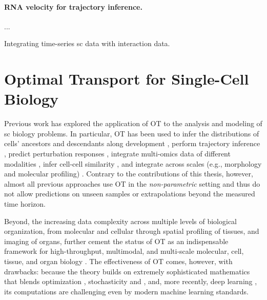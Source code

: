\paragraph{RNA velocity for trajectory inference.}
...

Integrating time-series \acrlong{sc} data with interaction data. 

\section{Optimal Transport for Single-Cell Biology}
\label{sec:ot_for_biology}

Previous work has explored the application of \acrlong{OT} to the analysis and modeling of \acrlong{sc} biology problems.
In particular, \acrshort{OT} has been used to infer the distributions of cells' ancestors and descendants along development \citep{schiebinger2019optimal}, perform trajectory inference \citep{bunne2022proximal, forrow2021lineageot, bunne2022recovering, lavenant2021towards, schiebinger2019optimal, tong2020trajectorynet, yang2020predicting, zhang2021optimal, chizat2022trajectory}, predict perturbation responses \citep{bunne2021learning, yang2018scalable, lubeck2022neural}, integrate multi-omics data of different modalities \citep{demetci2022scot}, infer cell-cell similarity \citep{huizing2022optimal}, and integrate across scales (e.g., morphology and molecular profiling) \citep{yang2021multi}. 
Contrary to the contributions of this thesis, however, almost all previous approaches use \acrshort{OT} in the \emph{non-parametric} setting and thus do not allow predictions on unseen samples or extrapolations beyond the measured time horizon.

Beyond, the increasing data complexity across multiple levels of biological organization, from molecular and cellular through spatial profiling of tissues, and imaging of organs, further cement the status of \acrshort{OT} as an indispensable framework for high-throughput, multimodal, and multi-scale molecular, cell, tissue, and organ biology \citep{moriel2021novosparc}. The effectiveness of \acrshort{OT} comes, however, with drawbacks: because the theory builds on extremely sophisticated mathematics that blends optimization \citep{cuturi2013sinkhorn, cuturi2022optimal}, stochasticity \citep{chizat2022trajectory, bunne2022recovering} and  \citep{bunne2022proximal}, and, more recently, deep learning \citep{tong2020trajectorynet, bunne2021learning, bunne2022supervised, yang2018scalable, lubeck2022neural, yang2021multi}, its computations are challenging even by modern machine learning standards.